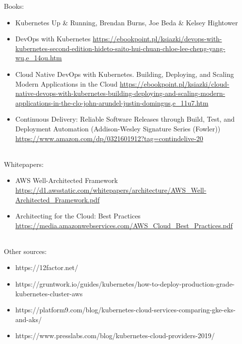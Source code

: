 \documentclass[12pt]{article}
\begin{document}
Books:
\begin{itemize}
    \item Kubernetes Up \& Running, Brendan Burns, Joe Beda & Kelsey Hightower
    \item DevOps with Kubernetes \url{https://ebookpoint.pl/ksiazki/devops-with-kubernetes-second-edition-hideto-saito-hui-chuan-chloe-lee-cheng-yang-wu,e_14ou.htm}
    \item Cloud Native DevOps with Kubernetes. Building, Deploying, and Scaling Modern Applications in the Cloud \url{https://ebookpoint.pl/ksiazki/cloud-native-devops-with-kubernetes-building-deploying-and-scaling-modern-applications-in-the-clo-john-arundel-justin-domingus,e_11u7.htm}
    \item Continuous Delivery: Reliable Software Releases through Build, Test, and Deployment Automation (Addison-Wesley Signature Series (Fowler)) \url{https://www.amazon.com/dp/0321601912?tag=contindelive-20}
\end{itemize}
~\\
Whitepapers:
\begin{itemize}
    \item AWS Well-Architected Framework \url{https://d1.awsstatic.com/whitepapers/architecture/AWS_Well-Architected_Framework.pdf}
    \item Architecting for the Cloud: Best Practices  \url{https://media.amazonwebservices.com/AWS_Cloud_Best_Practices.pdf}
\end{itemize}
~\\
Other sources:
\begin{itemize}
    \item https://12factor.net/
    \item https://gruntwork.io/guides/kubernetes/how-to-deploy-production-grade-kubernetes-cluster-aws
    \item https://platform9.com/blog/kubernetes-cloud-services-comparing-gke-eks-and-aks/
    \item  https://www.presslabs.com/blog/kubernetes-cloud-providers-2019/
\end{itemize}
\end{document}
